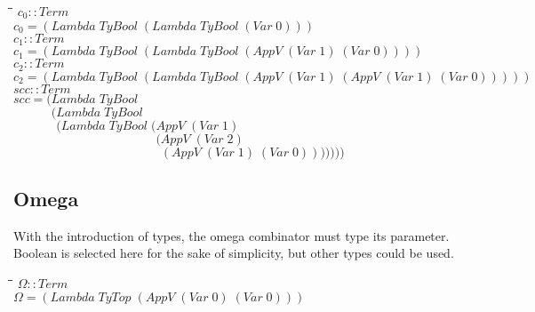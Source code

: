 \documentclass[10pt]{article}
\newlength{\lwidth}\setlength{\lwidth}{4.5cm}
\newlength{\cwidth}\setlength{\cwidth}{8mm} %
\newcommand{\Conid}[1]{\mathit{#1}}
\newcommand{\Varid}[1]{\mathit{#1}}
\begin{document}
\begin{tabbing}
\qquad\=\hspace{\lwidth}\=\hspace{\cwidth}\=\+\kill
${\Varid{c}_0\mathbin{::}\Conid{Term}}$\\
${\Varid{c}_0\mathrel{=}(\Conid{Lambda}\;\Conid{TyBool}\;(\Conid{Lambda}\;\Conid{TyBool}\;(\Conid{Var}\;\mathrm{0})))}$\\
${}$\\
${\Varid{c}_1\mathbin{::}\Conid{Term}}$\\
${\Varid{c}_1\mathrel{=}(\Conid{Lambda}\;\Conid{TyBool}\;(\Conid{Lambda}\;\Conid{TyBool}\;(\Conid{AppV}\;(\Conid{Var}\;\mathrm{1})\;(\Conid{Var}\;\mathrm{0}))))}$\\
${}$\\
${\Varid{c}_2\mathbin{::}\Conid{Term}}$\\
${\Varid{c}_2\mathrel{=}(\Conid{Lambda}\;\Conid{TyBool}\;(\Conid{Lambda}\;\Conid{TyBool}\;(\Conid{AppV}\;(\Conid{Var}\;\mathrm{1})\;(\Conid{AppV}\;(\Conid{Var}\;\mathrm{1})\;(\Conid{Var}\;\mathrm{0})))))}$\\
${}$\\
${\Varid{scc}\mathbin{::}\Conid{Term}}$\\
${\Varid{scc}\mathrel{=}(\Conid{Lambda}\;\Conid{TyBool}}$\\
${\phantom{\Varid{scc}\mathrel{=}(\mbox{}}(\Conid{Lambda}\;\Conid{TyBool}}$\\
${\phantom{\Varid{scc}\mathrel{=}(\mbox{}}\phantom{(\mbox{}}(\Conid{Lambda}\;\Conid{TyBool}\;(\Conid{AppV}\;(\Conid{Var}\;\mathrm{1})}$\\
${\phantom{\Varid{scc}\mathrel{=}(\mbox{}}\phantom{(\mbox{}}\phantom{(\Conid{Lambda}\;\Conid{TyBool}\;(\mbox{}}(\Conid{AppV}\;(\Conid{Var}\;\mathrm{2})}$\\
${\phantom{\Varid{scc}\mathrel{=}(\mbox{}}\phantom{(\mbox{}}\phantom{(\Conid{Lambda}\;\Conid{TyBool}\;(\mbox{}}\phantom{(\mbox{}}(\Conid{AppV}\;(\Conid{Var}\;\mathrm{1})\;(\Conid{Var}\;\mathrm{0})))))))}$
\end{tabbing}
\subsection{Omega}

With the introduction of types, the omega combinator must type its
parameter.  Boolean is selected here for the sake of simplicity, but
other types could be used.

\begin{tabbing}
\qquad\=\hspace{\lwidth}\=\hspace{\cwidth}\=\+\kill
${\Varid{\Omega}\mathbin{::}\Conid{Term}}$\\
${\Varid{\Omega}\mathrel{=}(\Conid{Lambda}\;\Conid{TyTop}\;(\Conid{AppV}\;(\Conid{Var}\;\mathrm{0})\;(\Conid{Var}\;\mathrm{0})))}$
\end{tabbing}
\end{document}
